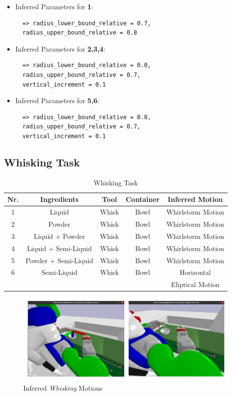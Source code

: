 \begin{itemize}
\item Inferred Parameters for \textbf{1}: 
 \begin{lstlisting}
  => radius_lower_bound_relative = 0.7, 
  radius_upper_bound_relative = 0.8
\end{lstlisting}
\item Inferred Parameters for \textbf{2,3,4}:
\begin{lstlisting}
  => radius_lower_bound_relative = 0.0, 
  radius_upper_bound_relative = 0.7,
  vertical_increment = 0.1
\end{lstlisting}
\item Inferred Parameters for \textbf{5,6}:
\begin{lstlisting}
  => radius_lower_bound_relative = 0.0, 
  radius_upper_bound_relative = 0.7,
  vertical_increment = 0.1
\end{lstlisting}
\end{itemize}

\subsection*{Whisking Task}

\begin{table}[H]
  \centering
  \begin{tabular}{|c|c|c|c|c|}
    \hline
    \textbf{Nr.} & \textbf{Ingredients} & \textbf{Tool} & \textbf{Container} & \textbf{Inferred Motion}  \\
    \hline
    1 & Liquid & Whisk & Bowl & Whirlstorm Motion \\
    \hline
    2 & Powder & Whisk & Bowl & Whirlstorm Motion\\
    \hline
    3 & Liquid + Powder & Whisk & Bowl & Whirlstorm Motion \\
    \hline
    4 & Liquid + Semi-Liquid & Whisk & Bowl & Whirlstorm Motion \\
    \hline
    5 & Powder + Semi-Liquid & Whisk & Bowl & Whirlstorm Motion \\
    \hline
    6 & Semi-Liquid & Whisk & Bowl & Horizontal
    \\ & & &  &Eliptical Motion \\
    \hline
  \end{tabular}
  \caption{Whisking Task}
  \label{tab:mixingtask}
\end{table}
\begin{figure}[H]
  \includegraphics[scale=0.25]{Graphics/whisking_evaluation.jpg}
  \caption{Inferred \textit{Whisking} Motions}
  \label{fig:mixingverb WikiHow}
\end{figure}

